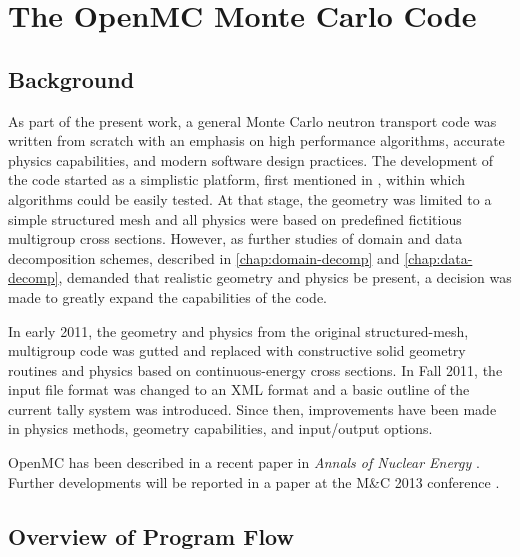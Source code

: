 \chapter{The OpenMC Monte Carlo Code}
\label{chap:openmc}

\section{Background}

As part of the present work, a general Monte Carlo neutron transport code was
written from scratch with an emphasis on high performance algorithms, accurate
physics capabilities, and modern software design practices. The development of
the code started as a simplistic platform, first mentioned in
\cite{lanl-romano-2009}, within which algorithms could be easily tested. At that
stage, the geometry was limited to a simple structured mesh and all physics were
based on predefined fictitious multigroup cross sections. However, as further
studies of domain and data decomposition schemes, described in
\autoref{chap:domain-decomp} and \autoref{chap:data-decomp}, demanded that
realistic geometry and physics be present, a decision was made to greatly expand
the capabilities of the code.

In early 2011, the geometry and physics from the original structured-mesh,
multigroup code was gutted and replaced with constructive solid geometry
routines and physics based on continuous-energy cross sections. In Fall 2011,
the input file format was changed to an XML format and a basic outline of the
current tally system was introduced. Since then, improvements have been made in
physics methods, geometry capabilities, and input/output options.

OpenMC has been described in a recent paper in \emph{Annals of Nuclear Energy}
\cite{ane-romano-2013}. Further developments will be reported in a paper at the
M\&C 2013 conference \cite{mc-romano-2013}.

\section{Overview of Program Flow}

